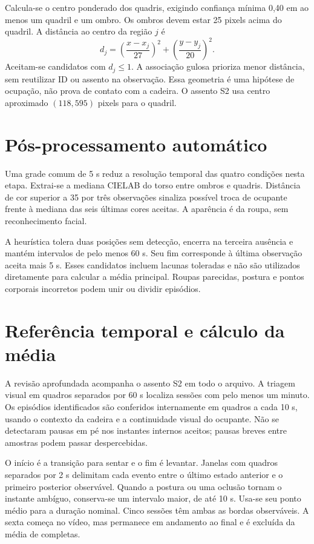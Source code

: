 \documentclass[12pt,a4paper,twoside,openany,chapter=TITLE,subsection=TITLE,section=TITLE,subsubsection=TITLE,english,brazil]{abntex2}
\begin{document}
Calcula-se o centro ponderado dos quadris, exigindo confiança mínima 0,40 em ao menos um quadril e um ombro. Os ombros devem estar 25 pixels acima do quadril. A distância ao centro da região $j$ é
\begin{equation}
d_j=\left(\frac{x-x_j}{27}\right)^2+\left(\frac{y-y_j}{20}\right)^2.
\end{equation}
Aceitam-se candidatos com $d_j\leq1$. A associação gulosa prioriza menor distância, sem reutilizar ID ou assento na observação. Essa geometria é uma hipótese de ocupação, não prova de contato com a cadeira. O assento S2 usa centro aproximado $(118,595)$ pixels para o quadril.

\section{Pós-processamento automático}
Uma grade comum de 5 s reduz a resolução temporal das quatro condições nesta etapa. Extrai-se a mediana CIELAB do torso entre ombros e quadris. Distância de cor superior a 35 por três observações sinaliza possível troca de ocupante frente à mediana das seis últimas cores aceitas. A aparência é da roupa, sem reconhecimento facial.

A heurística tolera duas posições sem detecção, encerra na terceira ausência e mantém intervalos de pelo menos 60 s. Seu fim corresponde à última observação aceita mais 5 s. Esses candidatos incluem lacunas toleradas e não são utilizados diretamente para calcular a média principal. Roupas parecidas, postura e pontos corporais incorretos podem unir ou dividir episódios.

\section{Referência temporal e cálculo da média}
A revisão aprofundada acompanha o assento S2 em todo o arquivo. A triagem visual em quadros separados por 60 s localiza sessões com pelo menos um minuto. Os episódios identificados são conferidos internamente em quadros a cada 10 s, usando o contexto da cadeira e a continuidade visual do ocupante. Não se detectaram pausas em pé nos instantes internos aceitos; pausas breves entre amostras podem passar despercebidas.

O início é a transição para sentar e o fim é levantar. Janelas com quadros separados por 2 s delimitam cada evento entre o último estado anterior e o primeiro posterior observável. Quando a postura ou uma oclusão tornam o instante ambíguo, conserva-se um intervalo maior, de até 10 s. Usa-se seu ponto médio para a duração nominal. Cinco sessões têm ambas as bordas observáveis. A sexta começa no vídeo, mas permanece em andamento ao final e é excluída da média de completas.
\end{document}

